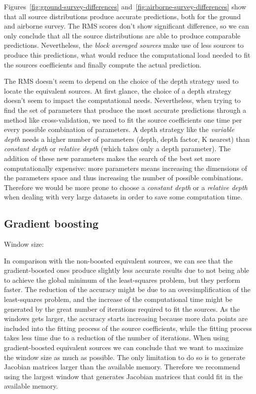 \documentclass[twocolumn]{article}
\begin{document}
Figures~\ref{fig:ground-survey-differences}
and~\ref{fig:airborne-survey-differences} show that all source distributions
produce accurate predictions, both for the ground and airborne survey.
The RMS scores don't show significant difference, so we can only conclude
that all the source distributions are able to produce comparable predictions.
Nevertheless, the \emph{block averaged sources} make use of less sources to
produce this predictions, what would reduce the computational load needed to
fit the sources coefficients and finally compute the actual prediction.

The RMS doesn't seem to depend on the choice of the depth strategy used to
locate the equivalent sources.
At first glance, the choice of a depth strategy doesn't seem to impact the
computational needs.
Nevertheless, when trying to find the set of parameters that produce the most
accurate predictions through a method like cross-validation, we need to fit the
source coefficients one time per every possible combination of parameters.
A depth strategy like the \emph{variable depth} needs a higher number of
parameters (depth, depth factor, K nearest) than \emph{constant depth} or
\emph{relative depth} (which takes only a depth parameter).
The addition of these new parameters makes the search of the best set more
computationally expensive: more parameters means increasing the dimensions of
the parameters space and thus increasing the number of possible combinations.
Therefore we would be more prone to choose a \emph{constant depth} or
a \emph{relative depth} when dealing with very large datasets in order to save
some computation time.

\subsection{Gradient boosting}

Window size:

In comparison with the non-boosted equivalent sources, we can see that the
gradient-boosted ones produce slightly less accurate results due to not being
able to achieve the global minimum of the least-squares problem, but they
perform faster.
The reduction of the accuracy might be due to an oversimplification of the
least-squares problem, and the increase of the computational time might be
generated by the great number of iterations required to fit the sources.
As the windows gets larger, the accuracy starts increasing because more data
points are included into the fitting process of the source coefficients, while
the fitting process takes less time due to a reduction of the number of
iterations.
When using gradient-boosted equivalent sources we can conclude that we want to
maximize the window size as much as possible.
The only limitation to do so is to generate Jacobian matrices larger than the
available memory.
Therefore we recommend using the largest window that generates Jacobian
matrices that could fit in the available memory.
\end{document}
